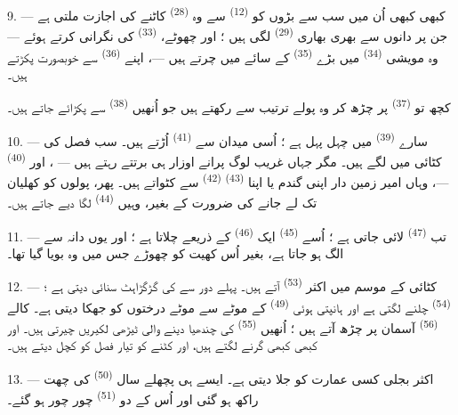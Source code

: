 9. --- کبھی کبھی اُن میں سب سے بڑوں کو 
\textsuperscript{(12)} سے وہ  \textsuperscript{(28)}
کاٹنے کی اجازت ملتی ہے جن پر دانوں سے بھری بھاری 
\textsuperscript{(29)} لگی ہیں ؛ اور چھوٹے، 
\textsuperscript{(33)} کی نگرانی کرتے ہوئے — وہ مویشی 
\textsuperscript{(34)} میں بڑے 
\textsuperscript{(35)} کے سائے میں چرتے ہیں —، اپنے 
\textsuperscript{(36)} سے خوبصورت  پکڑتے ہیں۔

کچھ تو  \textsuperscript{(37)} پر چڑھ کر وہ پولے ترتیب سے
رکھتے ہیں جو اُنھیں  \textsuperscript{(38)} سے پکڑائے
جاتے ہیں۔

10. --- سارے  \textsuperscript{(39)} میں چہل پہل ہے ؛ اُسی
میدان سے  \textsuperscript{(41)} اُڑتے ہیں۔ سب فصل کی
کٹائی میں لگے ہیں۔ مگر جہاں غریب لوگ پرانے اوزار ہی برتتے رہتے ہیں —
،  اور  \textsuperscript{(40)} —، وہاں امیر زمین دار اپنی گندم یا اپنا
 \textsuperscript{(43)} 
\textsuperscript{(42)} سے کٹواتے ہیں۔ پھر، پولوں کو کھلیان تک لے جانے
کی ضرورت کے بغیر، وہیں 
\textsuperscript{(44)} لگا دیے جاتے ہیں۔

11. --- تب  \textsuperscript{(47)} لائی جاتی ہے ؛
اُسے  \textsuperscript{(45)} ایک 
\textsuperscript{(46)} کے ذریعے چلاتا ہے ؛ اور یوں دانہ
 سے الگ ہو جاتا ہے، بغیر اُس کھیت کو چھوڑے جس میں وہ
بویا گیا تھا۔

\VUsaut{5.0mm}
\VUsaut{3.4mm}

12. --- کٹائی کے موسم میں اکثر 
\textsuperscript{(53)} آتے ہیں۔ پہلے دور سے  کی گڑگڑاہٹ
سنائی دیتی ہے ؛  \textsuperscript{(54)} چلنے لگتی ہے
اور ہانپتی ہوئی  \textsuperscript{(49)} کے موٹے سے
موٹے درختوں کو جھکا دیتی ہے۔ کالے  \textsuperscript{(56)}
آسمان پر چڑھ آتے ہیں ؛ اُنھیں  \textsuperscript{(55)} کی
چندھیا دینے والی ٹیڑھی لکیریں چیرتی ہیں۔  اور کبھی کبھی
 گرنے لگتے ہیں، اور کٹنے کو تیار فصل کو کچل دیتے ہیں۔

13. --- اکثر بجلی کسی عمارت کو جلا دیتی ہے۔ ایسے ہی پچھلے سال
 \textsuperscript{(50)} کی چھت راکھ ہو گئی اور اُس کے دو
 \textsuperscript{(51)} چور چور ہو گئے۔

